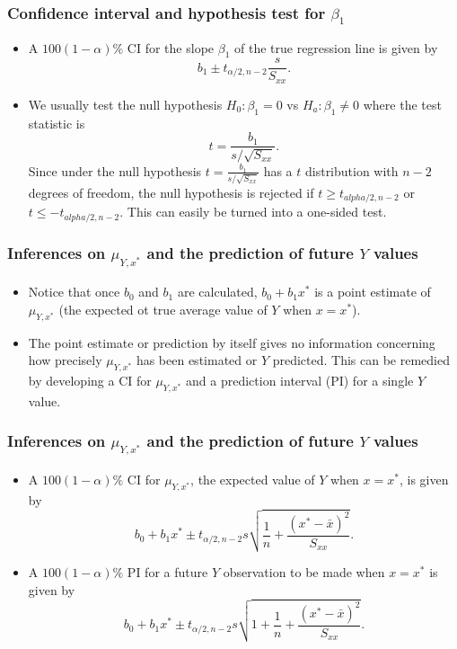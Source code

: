 \begin{frame}[fragile]\frametitle{Confidence interval and hypothesis test for $\beta_{1}$}

\begin{itemize}
\item A $100(1-\alpha)\%$ CI for the slope $\beta_{1}$ of the true regression line is given by
\begin{displaymath}
b_{1}\pm t_{\alpha/2,n-2}\frac{s}{S_{xx}}.
\end{displaymath}
\item We usually test the null hypothesis $H_{0}: \beta_{1}=0$ vs $H_{a}: \beta_{1}\neq 0$ where the test statistic is
\begin{displaymath}
t=\frac{b_{1}}{s/\sqrt{S_{xx}}}.
\end{displaymath}
Since under the null hypothesis $t=\frac{b_{1}}{s/\sqrt{S_{xx}}}$ has a $t$ distribution with $n-2$ degrees of freedom, the null hypothesis is rejected if $t\geq t_{alpha/2,n-2}$ or $t\leq -t_{alpha/2,n-2}$. This can easily be turned into a one-sided test.
\end{itemize}
\end{frame}

\begin{frame}[fragile]\frametitle{Inferences on $\mu_{Y,x^{*}}$ and the prediction of future $Y$ values}

\begin{itemize}
\item Notice that once $b_{0}$ and $b_{1}$ are calculated, $b_{0}+b_{1}x^{*}$ is a point estimate of $\mu_{Y,x^{*}}$ (the expected ot true average value of $Y$ when $x=x^{*}$).
\item The point estimate or prediction by itself gives no information concerning how precisely $\mu_{Y,x^{*}}$ has been estimated or $Y$ predicted. This can be remedied by developing a CI for $\mu_{Y,x^{*}}$ and a prediction interval (PI) for a single $Y$ value.
\end{itemize}
\end{frame}

\begin{frame}[fragile]\frametitle{Inferences on $\mu_{Y,x^{*}}$ and the prediction of future $Y$ values}

\begin{itemize}
\item A $100(1-\alpha)\%$ CI for $\mu_{Y,x^{*}}$, the expected value of $Y$ when $x=x^{*}$, is given by
\begin{displaymath}
b_{0}+b_{1}x^{*}\pm t_{\alpha/2,n-2}s\sqrt{\frac{1}{n}+\frac{(x^{*}-\bar{x})^{2}}{S_{xx}}}.
\end{displaymath}
\item A $100(1-\alpha)\%$ PI for a future $Y$ observation to be made when $x=x^{*}$ is given by
\begin{displaymath}
b_{0}+b_{1}x^{*}\pm t_{\alpha/2,n-2}s\sqrt{1+\frac{1}{n}+\frac{(x^{*}-\bar{x})^{2}}{S_{xx}}}.
\end{displaymath}
\end{itemize}
\end{frame}

